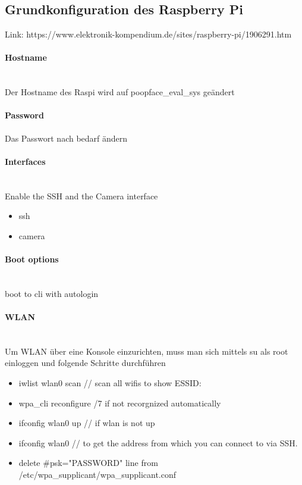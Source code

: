 \subsection{Grundkonfiguration des Raspberry Pi}

Link: https://www.elektronik-kompendium.de/sites/raspberry-pi/1906291.htm

\paragraph{Hostname} \hspace{0pt} \\
Der Hostname des Raspi wird auf poopface\_eval\_sys geändert
\paragraph{Password}
Das Passwort nach bedarf ändern %
\paragraph{Interfaces} \hspace{0pt} \\
Enable the SSH and the Camera interface
\begin{itemize}
  \item ssh
  \item camera
\end{itemize}

\paragraph{Boot options} \hspace{0pt} \\
boot to cli with autologin

\paragraph{WLAN} \hspace{0pt}\\
Um WLAN über eine Konsole einzurichten, muss man sich mittels su als root einloggen und folgende Schritte durchführen

\begin{itemize}
  \item iwlist wlan0 scan // scan all wifis to show ESSID:
  \item wpa\_cli reconfigure /7 if not recorgnized automatically
  \item ifconfig wlan0 up // if wlan is not up
  \item ifconfig wlan0 // to get the address from which you can connect to via SSH.
  \item delete \#psk="PASSWORD" line from /etc/wpa\_supplicant/wpa\_supplicant.conf
\end{itemize}

